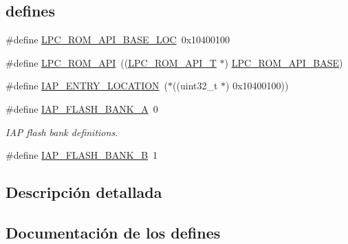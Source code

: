 \subsection*{\textquotesingle{}defines\textquotesingle{}}
\begin{DoxyCompactItemize}
\item 
\#define \hyperlink{group___r_o_m_a_p_i__18_x_x__43_x_x_gafd3ca6cb0ad8c0c0b5be437a8387e51b}{L\+P\+C\+\_\+\+R\+O\+M\+\_\+\+A\+P\+I\+\_\+\+B\+A\+S\+E\+\_\+\+L\+OC}~0x10400100
\item 
\#define \hyperlink{group___r_o_m_a_p_i__18_x_x__43_x_x_ga93f07fc38c09c20a7141e175ce599ef7}{L\+P\+C\+\_\+\+R\+O\+M\+\_\+\+A\+PI}~((\hyperlink{struct_l_p_c___r_o_m___a_p_i___t}{L\+P\+C\+\_\+\+R\+O\+M\+\_\+\+A\+P\+I\+\_\+T} $\ast$) \hyperlink{group___p_e_r_i_p_h__43_x_x___b_a_s_e_ga2ae00d891b7603694f3a1eb640013f63}{L\+P\+C\+\_\+\+R\+O\+M\+\_\+\+A\+P\+I\+\_\+\+B\+A\+SE})
\item 
\#define \hyperlink{group___r_o_m_a_p_i__18_x_x__43_x_x_ga3d74da11ceb6b4ccf6d3730825406515}{I\+A\+P\+\_\+\+E\+N\+T\+R\+Y\+\_\+\+L\+O\+C\+A\+T\+I\+ON}~($\ast$((uint32\+\_\+t $\ast$) 0x10400100))
\item 
\#define \hyperlink{group___r_o_m_a_p_i__18_x_x__43_x_x_gafb9244f2e5a4884eb1bf5fb89c2b7f5b}{I\+A\+P\+\_\+\+F\+L\+A\+S\+H\+\_\+\+B\+A\+N\+K\+\_\+A}~0
\begin{DoxyCompactList}\small\item\em I\+AP flash bank definitions. \end{DoxyCompactList}\item 
\#define \hyperlink{group___r_o_m_a_p_i__18_x_x__43_x_x_ga1000a64e320d9e09ba9c671bbb380dd2}{I\+A\+P\+\_\+\+F\+L\+A\+S\+H\+\_\+\+B\+A\+N\+K\+\_\+B}~1
\end{DoxyCompactItemize}


\subsection{Descripción detallada}


\subsection{Documentación de los \textquotesingle{}defines\textquotesingle{}}
